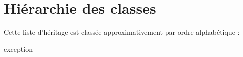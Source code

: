 \section{Hiérarchie des classes}
Cette liste d'héritage est classée approximativement par ordre alphabétique \+:\begin{DoxyCompactList}
\item {}
\item exception\begin{DoxyCompactList}
\item {}
\end{DoxyCompactList}
\end{DoxyCompactList}
